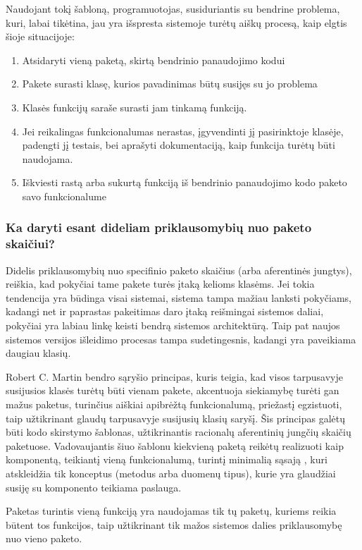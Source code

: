 Naudojant tokį šabloną, programuotojas, susiduriantis su bendrine problema, kuri, labai tikėtina, jau yra išspresta sistemoje turėtų
aiškų procesą, kaip elgtis šioje situacijoje:
\begin{enumerate}
    \item Atsidaryti vieną paketą, skirtą bendrinio panaudojimo kodui
    \item Pakete surasti klasę, kurios pavadinimas būtų susijęs su jo problema
    \item Klasės funkcijų saraše surasti jam tinkamą funkciją.
    \item Jei reikalingas funkcionalumas nerastas, įgyvendinti jį pasirinktoje klasėje, padengti jį testais,
    bei aprašyti dokumentaciją, kaip funkcija turėtų būti naudojama.
    \item Iškviesti rastą arba sukurtą funkciją iš bendrinio panaudojimo kodo paketo savo funkcionalume
\end{enumerate}

\subsubsection{Ka daryti esant dideliam priklausomybių nuo paketo skaičiui?}
Didelis priklausomybių nuo specifinio paketo skaičius (arba aferentinės jungtys), reiškia, kad pokyčiai tame pakete turės įtaką kelioms klasėms.
Jei tokia tendencija yra būdinga visai sistemai, sistema tampa mažiau lanksti pokyčiams, kadangi net ir paprastas pakeitimas
daro įtaką reišmingai sistemos daliai, pokyčiai yra labiau linkę keisti bendrą sistemos architektūrą.
Taip pat naujos sistemos versijos išleidimo  procesas tampa sudetingesnis, kadangi yra paveikiama daugiau klasių.

Robert C. Martin bendro sąryšio principas, kuris teigia, kad visos tarpusavyje susijusios klasės turėtų būti vienam pakete,
akcentuoja siekiamybę turėti gan mažus paketus, turinčius aiškiai apibrėžtą funkcionalumą, priežastį egzistuoti, taip užtikrinant
glaudų tarpusavyje susijusių klasių saryšį.
Šis principas galėtų būti kodo skirstymo šablonas, užtikrinantis racionalų aferentinių jungčių skaičių paketuose.
Vadovaujantis šiuo šablonu kiekvieną paketą reikėtų realizuoti kaip komponentą, teikiantį vieną funkcionalumą,
turintį minimalią sąsają , kuri atskleidžia tik konceptus (metodus arba duomenų tipus),
kurie yra glaudžiai susiję su komponento teikiama paslauga.

Paketas turintis vieną funkciją yra naudojamas tik tų paketų, kuriems reikia būtent tos funkcijos,
taip užtikrinant tik mažos sistemos dalies priklausomybę nuo vieno paketo.

